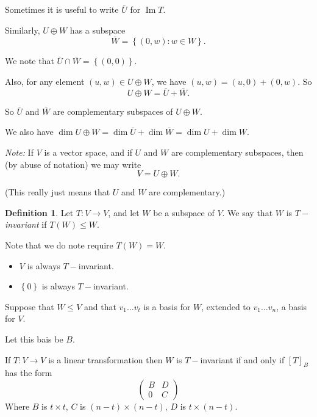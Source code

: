 \documentclass{article}
\theoremstyle{definition} \newtheorem*{definition}{Definition}
\DeclareMathOperator{\Ima}{Im} \DeclareMathOperator{\Sym}{Sym}
\begin{document}
Sometimes it is useful to write $\bar{U}$ for $\Ima T$.

Similarly, $U \oplus W$ has a subspace 
\[
  \bar{W} = \left\{ (0, w) : w \in W \right\}.
  \]

  We note that $\bar{U} \cap \bar{W} = \left\{ (0,0) \right\}$.

  Also, for any element $(u,w) \in U \oplus W$, we have 
  $(u,w) = (u,0) + (0,w)$. So 
  \[
    U \oplus W = \bar{U} + \bar{W}.
  \]

  So $\bar{U}$ and $\bar{W}$ are complementary subspaces of $U \oplus W$.

  We also have $\dim U \oplus W = \dim \bar{U} + \dim \bar{W} = 
  \dim U + \dim W$.

  \emph{Note:} If $V$ is a vector space, and if $U$ and $W$ are 
  complementary subspaces, then (by abuse of notation) we may write
  \[
    V = U \oplus W.
  \]

  (This really just means that $U$ and $W$ are complementary.)\\


  \begin{definition}
    Let $T:V \rightarrow V$, and let $W$ be a subspace of $V$. We say 
    that $W$ is $T-$\emph{invariant} if $T(W) \leq W$. 

    Note that we do note require $T(W) = W$.\\
  \end{definition}

  \begin{exmps}\hfill
    \begin{itemize}
      \item 
        $V$ is always $T-$invariant.
      \item $\left\{ 0 \right\}$ is always $T-$invariant.
    \end{itemize}
  \end{exmps}

  Suppose that $W \leq V$ and that $v_1 \dots v_t$ is a basis for $W$,
  extended to $v_1 \dots v_n$, a basis for $V$.

  Let this bais be $B$.

  If $T : V \rightarrow V$ is a linear transformation then $W$ is
  $T-$invariant if and only if $[T]_B$ has the form
  \[
    \left( 
      \begin{matrix}
        B & D \\
        0 & C
      \end{matrix}
    \right)
  \]
 Where $B$ is $t \times t$, $C$ is $(n-t)\times (n-t)$, $D$ is $t \times
 (n-t)$.
\end{document}
